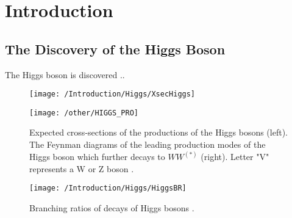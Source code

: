 
\chapter{Introduction} 


\section{The Discovery of the Higgs Boson}
The Higgs boson is discovered ..

\begin{figure}[!h]
	\graphicspath{ {./Figures/} }
	\centering
	\begin{minipage}[h]{0.45\textwidth}
		\texttt{[image: /Introduction/Higgs/XsecHiggs]}
	\end{minipage}
	\begin{minipage}[h]{0.54\textwidth}
		\texttt{[image: /other/HIGGS\_PRO]}
	\end{minipage}
	\caption{Expected cross-sections of the productions of the Higgs bosons (left). The Feynman diagrams of the leading production modes of the Higgs boson which further decays to  $WW^{(*)}$ (right). Letter "V" represents a W or Z boson \cite{ATLAS:2014aga}.}
	\label{fig:Higgs_pro}
\end{figure}


\begin{figure}[!h]
	\graphicspath{ {./Figures/} }
	\centering
	\texttt{[image: /Introduction/Higgs/HiggsBR]}
	\caption{Branching ratios of decays of Higgs bosons \cite{PDGReview}.}
	\label{fig:Higgs_decay}
\end{figure}





